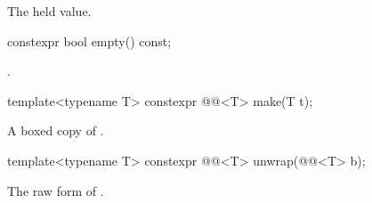 \begin{itemdescr}
\pnum
\returns
The held value.
\end{itemdescr}

%
\begin{itemdecl}
constexpr bool empty() const;
\end{itemdecl}

\begin{itemdescr}
\pnum
\returns
{}.
\end{itemdescr}

%
\begin{itemdecl}
template<typename T>
  constexpr @@<T> make(T t);
\end{itemdecl}

\begin{itemdescr}
\pnum
\returns
A boxed copy of .
\end{itemdescr}

%
\begin{itemdecl}
template<typename T>
  constexpr @@<T> unwrap(@@<T> b);
\end{itemdecl}

\begin{itemdescr}
\pnum
\returns
The raw form of .
\end{itemdescr}
